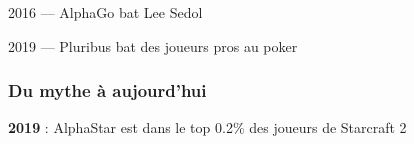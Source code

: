 \begin{frame}{2016 --- AlphaGo bat Lee Sedol}
\end{frame}

\begin{frame}{2019 --- Pluribus bat des joueurs pros au poker}
\end{frame}


\begin{frame}
  \frametitle{Du mythe à aujourd'hui}
  \textbf{2019} : AlphaStar est dans le top 0.2\% des joueurs de Starcraft 2
\end{frame}
